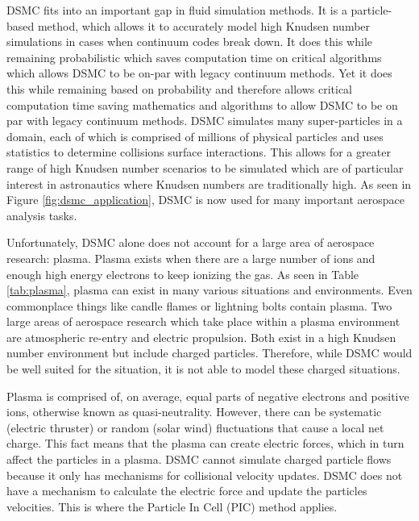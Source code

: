 \indent DSMC fits into an important gap in fluid simulation methods. It is a particle-based method, which allows it to accurately model high Knudsen number simulations in cases when continuum codes break down. It does this while remaining probabilistic which saves computation time on critical algorithms which allows DSMC to be on-par with legacy continuum methods. Yet it does this while remaining based on probability and therefore allows critical computation time saving mathematics and algorithms to allow DSMC to be on par with legacy continuum methods. DSMC simulates many super-particles in a domain, each of which is comprised of millions of physical particles and uses statistics to determine collisions surface interactions. This allows for a greater range of high Knudsen number scenarios to be simulated which are of particular interest in astronautics where Knudsen numbers are traditionally high. As seen in Figure \ref{fig:dsmc_application}, DSMC is now used for many important aerospace analysis tasks. \par


\indent Unfortunately, DSMC alone does not account for a large area of aerospace research: plasma. Plasma exists when there are a large number of ions and enough high energy electrons to keep ionizing the gas. As seen in Table \ref{tab:plasma}, plasma can exist in many various situations and environments. Even commonplace things like candle flames or lightning bolts contain plasma. Two large areas of aerospace research which take place within a plasma environment are atmospheric re-entry and electric propulsion. Both exist in a high Knudsen number environment but include charged particles. Therefore, while DSMC would be well suited for the situation, it is not able to model these charged situations. \par




\indent Plasma is comprised of, on average, equal parts of negative electrons and positive ions, otherwise known as quasi-neutrality. However, there can be systematic (electric thruster) or random (solar wind) fluctuations that cause a local net charge. This fact means that the plasma can create electric forces, which in turn affect the particles in a plasma. DSMC cannot simulate charged particle flows because it only has mechanisms for collisional velocity updates. DSMC does not have a mechanism to calculate the electric force and update the particles velocities. This is where the Particle In Cell (PIC) method applies. \par


